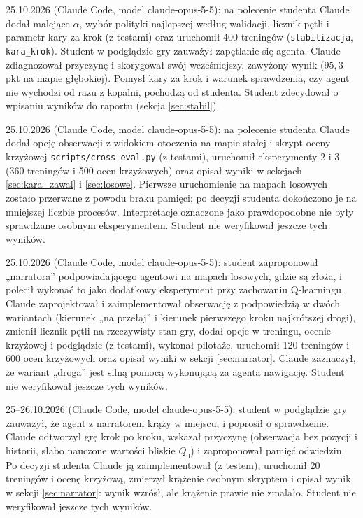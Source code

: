 25.10.2026 (Claude Code, model claude-opus-5-5): na polecenie studenta Claude dodał
malejące $\alpha$, wybór polityki najlepszej według walidacji, licznik pętli
i parametr kary za krok (z testami) oraz uruchomił 400 treningów
(\texttt{stabilizacja}, \texttt{kara\_krok}). Student w podglądzie gry zauważył
zapętlanie się agenta. Claude zdiagnozował przyczynę i skorygował swój wcześniejszy,
zawyżony wynik ($95{,}3$ pkt na mapie głębokiej). Pomysł kary za krok i warunek
sprawdzenia, czy agent nie wychodzi od razu z kopalni, pochodzą od studenta.
Student zdecydował o wpisaniu wyników do raportu (sekcja \ref{sec:stabil}).

25.10.2026 (Claude Code, model claude-opus-5-5): na polecenie studenta Claude dodał
opcję obserwacji z widokiem otoczenia na mapie stałej i skrypt oceny krzyżowej
\texttt{scripts/cross\_eval.py} (z testami), uruchomił eksperymenty 2 i 3
(360 treningów i 500 ocen krzyżowych) oraz opisał wyniki w sekcjach
\ref{sec:kara_zawal} i \ref{sec:losowe}. Pierwsze uruchomienie na mapach losowych
zostało przerwane z powodu braku pamięci; po decyzji studenta dokończono je na
mniejszej liczbie procesów. Interpretacje oznaczone jako prawdopodobne nie były
sprawdzane osobnym eksperymentem. Student nie weryfikował jeszcze tych wyników.

25.10.2026 (Claude Code, model claude-opus-5-5): student zaproponował „narratora”
podpowiadającego agentowi na mapach losowych, gdzie są złoża, i polecił wykonać to
jako dodatkowy eksperyment przy zachowaniu Q-learningu. Claude zaprojektował
i zaimplementował obserwację z podpowiedzią w dwóch wariantach (kierunek „na przełaj”
i kierunek pierwszego kroku najkrótszej drogi), zmienił licznik pętli na rzeczywisty
stan gry, dodał opcje w treningu, ocenie krzyżowej i podglądzie (z testami), wykonał
pilotaże, uruchomił 120 treningów i 600 ocen krzyżowych oraz opisał wyniki w sekcji
\ref{sec:narrator}. Claude zaznaczył, że wariant „droga” jest silną pomocą
wykonującą za agenta nawigację. Student nie weryfikował jeszcze tych wyników.

25--26.10.2026 (Claude Code, model claude-opus-5-5): student w podglądzie gry
zauważył, że agent z narratorem krąży w miejscu, i poprosił o sprawdzenie. Claude
odtworzył grę krok po kroku, wskazał przyczynę (obserwacja bez pozycji i historii,
słabo nauczone wartości bliskie $Q_0$) i zaproponował pamięć odwiedzin. Po decyzji
studenta Claude ją zaimplementował (z testem), uruchomił 20 treningów i ocenę
krzyżową, zmierzył krążenie osobnym skryptem i opisał wynik w sekcji
\ref{sec:narrator}: wynik wzrósł, ale krążenie prawie nie zmalało. Student nie
weryfikował jeszcze tych wyników.

